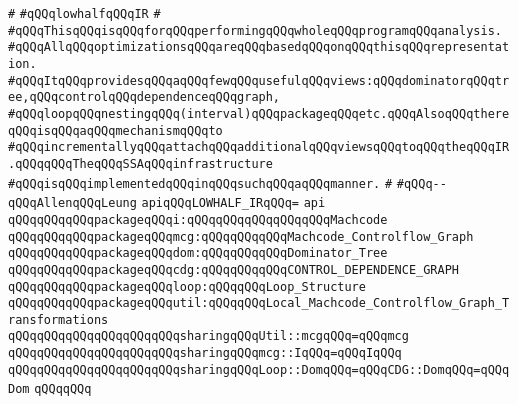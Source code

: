 \label{src/lib/compiler/back/low/ir/lowhalf-ir.api}
\verb|#|\newline
\verb|#qQQqlowhalfqQQqIR|\newline
\verb|#|\newline
\verb|#qQQqThisqQQqisqQQqforqQQqperformingqQQqwholeqQQqprogramqQQqanalysis.|\newline
\verb|#qQQqAllqQQqoptimizationsqQQqareqQQqbasedqQQqonqQQqthisqQQqrepresentation.|\newline
\verb|#qQQqItqQQqprovidesqQQqaqQQqfewqQQqusefulqQQqviews:qQQqdominatorqQQqtree,qQQqcontrolqQQqdependenceqQQqgraph,|\newline
\verb|#qQQqloopqQQqnestingqQQq(interval)qQQqpackageqQQqetc.qQQqAlsoqQQqthereqQQqisqQQqaqQQqmechanismqQQqto|\newline
\verb|#qQQqincrementallyqQQqattachqQQqadditionalqQQqviewsqQQqtoqQQqtheqQQqIR.qQQqqQQqTheqQQqSSAqQQqinfrastructure|\newline
\verb|#qQQqisqQQqimplementedqQQqinqQQqsuchqQQqaqQQqmanner.|\newline
\verb|#|\newline
\verb|#qQQq--qQQqAllenqQQqLeung|\newline
\newline
\newline
\verb|apiqQQqLOWHALF_IRqQQq=|\newline
\verb|api|\newline
\newline
\verb|qQQqqQQqqQQqpackageqQQqi:qQQqqQQqqQQqqQQqqQQqMachcode|\newline
\verb|qQQqqQQqqQQqpackageqQQqmcg:qQQqqQQqqQQqMachcode_Controlflow_Graph|\newline
\verb|qQQqqQQqqQQqpackageqQQqdom:qQQqqQQqqQQqDominator_Tree|\newline
\verb|qQQqqQQqqQQqpackageqQQqcdg:qQQqqQQqqQQqCONTROL_DEPENDENCE_GRAPH|\newline
\verb|qQQqqQQqqQQqpackageqQQqloop:qQQqqQQqLoop_Structure|\newline
\verb|qQQqqQQqqQQqpackageqQQqutil:qQQqqQQqLocal_Machcode_Controlflow_Graph_Transformations|\newline
\verb|qQQqqQQqqQQqqQQqqQQqqQQqsharingqQQqUtil::mcgqQQq=qQQqmcg|\newline
\verb|qQQqqQQqqQQqqQQqqQQqqQQqsharingqQQqmcg::IqQQq=qQQqIqQQq|\newline
\verb|qQQqqQQqqQQqqQQqqQQqqQQqsharingqQQqLoop::DomqQQq=qQQqCDG::DomqQQq=qQQqDom|\newline
\verb|qQQqqQQq|\newline
